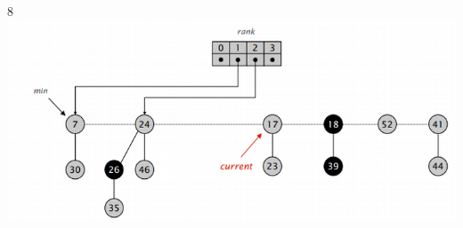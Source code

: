 \documentclass{beamer}
\begin{document}
\begin{frame}
\begin{columns}[t]
    8
    \includegraphics[width =1 \textwidth]{imagenes/delete8.png}

   \end{columns}
   \end{frame}
   
\end{document}
